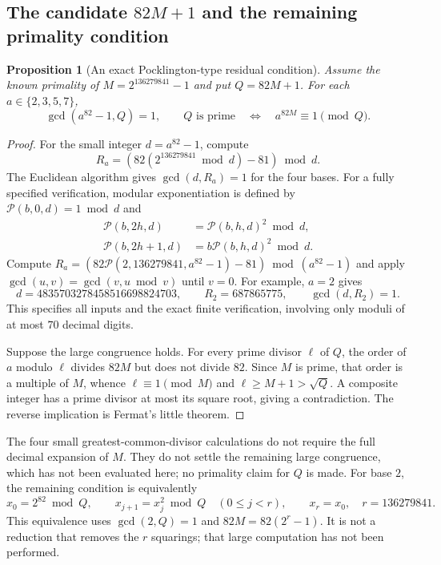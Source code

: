 \documentclass[11pt,a4paper]{article}
\newtheorem{proposition}[theorem]{Proposition}
\theoremstyle{definition}
\theoremstyle{remark}
\numberwithin{equation}{section}
\begin{document}
\subsection{The candidate \texorpdfstring{$82M+1$}{82M+1} and the remaining primality condition}
\begin{proposition}[An exact Pocklington-type residual condition]
Assume the known primality of $M=2^{136279841}-1$ and put $Q=82M+1$.
For each $a\in\{2,3,5,7\}$,
\[
 \gcd(a^{82}-1,Q)=1,
 \qquad
 Q\text{ is prime}\quad\Longleftrightarrow\quad
 a^{82M}\equiv1\pmod Q.
\]
\end{proposition}
\begin{proof}
For the small integer $d=a^{82}-1$, compute
\[
 R_a=(82(2^{136279841}\bmod d)-81)\bmod d.
\]
The Euclidean algorithm gives $\gcd(d,R_a)=1$ for the four bases.
For a fully specified verification, modular exponentiation is defined by
$\mathcal P(b,0,d)=1\bmod d$ and
\[
\begin{split}
 \mathcal P(b,2h,d)&=\mathcal P(b,h,d)^2\bmod d,\\
 \mathcal P(b,2h+1,d)&=b\mathcal P(b,h,d)^2\bmod d.
\end{split}
\]
Compute $R_a=(82\mathcal P(2,136279841,a^{82}-1)-81)\bmod(a^{82}-1)$
and apply $\gcd(u,v)=\gcd(v,u\bmod v)$ until $v=0$.
For example, $a=2$ gives
\[
 d=4835703278458516698824703,\qquad R_2=687865775,
 \qquad\gcd(d,R_2)=1.
\]
This specifies all inputs and the exact finite verification, involving
only moduli of at most $70$ decimal digits.

Suppose the large congruence holds. For every prime divisor $\ell$ of
$Q$, the order of $a$ modulo $\ell$ divides $82M$ but does not divide
$82$. Since $M$ is prime, that order is a multiple of $M$, whence
$\ell\equiv1\pmod M$ and $\ell\ge M+1>\sqrt Q$.
A composite integer has a prime divisor at most its square root, giving
a contradiction. The reverse implication is Fermat's little theorem.
\end{proof}
The four small greatest-common-divisor calculations do not require the
full decimal expansion of $M$. They do not settle the remaining large
congruence, which has not been evaluated here; no primality claim for
$Q$ is made. For base $2$, the remaining condition is equivalently
\[
 x_0=2^{82}\bmod Q,\qquad x_{j+1}=x_j^2\bmod Q
 \quad(0\le j<r),\qquad x_r=x_0,
 \quad r=136279841.
\]
This equivalence uses $\gcd(2,Q)=1$ and
$82M=82(2^r-1)$. It is not a reduction that removes the $r$ squarings;
that large computation has not been performed.
\end{document}
